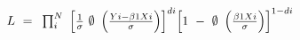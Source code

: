 $L{\rm{\ }} = {\rm{\ }}\prod _i^N{\rm{\ }}{{\left[ {\frac{1}{\sigma }{\rm{\ }}\emptyset {\rm{\ }}\left( {\frac{{Yi - \beta 1Xi}}{\sigma }} \right)} \right]}^{di}}{{\left[ {1{\rm{\ }} - {\rm{\ }}\emptyset {\rm{\ }}\left( {\frac{{\beta 1Xi}}{\sigma }} \right)} \right]}^{1 - di}}$
